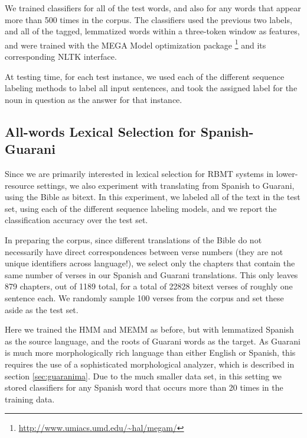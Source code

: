 \documentclass[11pt]{article}
\begin{document}
We trained classifiers for all of the test words, and also for any words that
appear more than 500 times in the corpus. The classifiers used the previous two
labels, and all of the tagged, lemmatized words within a three-token window as
features, and were trained with the MEGA Model optimization package
\footnote{\url{http://www.umiacs.umd.edu/~hal/megam/}} and its corresponding
NLTK interface.

At testing time, for each test instance, we used each of the different sequence
labeling methods to label all input sentences, and took the assigned label for
the noun in question as the answer for that instance.

\subsection{All-words Lexical Selection for Spanish-Guarani}
Since we are primarily interested in lexical selection for RBMT systems in
lower-resource settings, we also experiment with translating from Spanish to
Guarani, using the Bible as bitext. In this experiment, we labeled all of the
text in the test set, using each of the different sequence labeling models, and
we report the classification accuracy over the test set.

In preparing the corpus, since different translations of the Bible do not
necessarily have direct correspondences between verse numbers (they are not
unique identifiers across language!), we select only the chapters that contain
the same number of verses in our Spanish and Guarani translations.  This only
leaves 879 chapters, out of 1189 total, for a total of 22828 bitext verses of
roughly one sentence each. We randomly sample 100 verses from the corpus and
set these aside as the test set.

Here we trained the HMM and MEMM as before, but with lemmatized Spanish as the
source language, and the roots of Guarani words as the target.  As Guarani is
much more morphologically rich language than either English or Spanish, this
requires the use of a sophisticated morphological analyzer, which is described
in section \ref{sec:guaranima}. Due to the much smaller data set, in this
setting we stored classifiers for any Spanish word that occurs more than 20
times in the training data.
\end{document}

